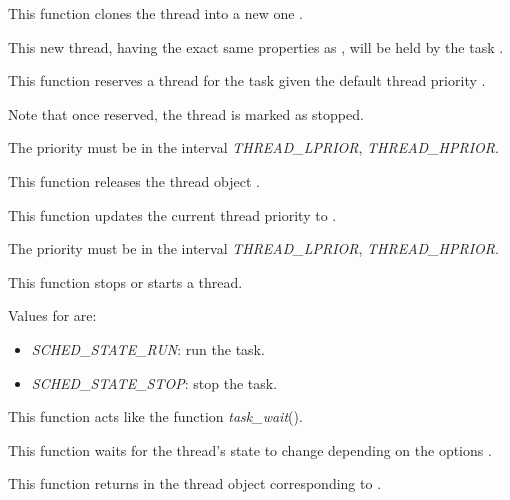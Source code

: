 {
  This function clones the thread  into a new one
  .

  This new thread, having the exact same properties as ,
  will be held by the task .
}

{
  This function reserves a thread for the task 
  given the default thread priority .

  Note that once reserved, the thread is marked as stopped.

  The priority must be in the interval \emph{THREAD\_LPRIOR},
  \emph{THREAD\_HPRIOR}.
}

{
  This function releases the thread object .
}

{
  This function updates the current thread priority
  to .

  The priority must be in the interval \emph{THREAD\_LPRIOR},
  \emph{THREAD\_HPRIOR}.
}

{
  This function stops or starts a thread.

  Values for  are:

  \begin{itemize}
  \item
    \emph{SCHED\_STATE\_RUN}: run the task.
  \item
    \emph{SCHED\_STATE\_STOP}: stop the task.
  \end{itemize}
}

{
  This function acts like the function \emph{task\_wait}().

  This function waits for the thread's state to change depending on
  the options .

}

{
  This function returns in  the thread object
  corresponding to .
}

